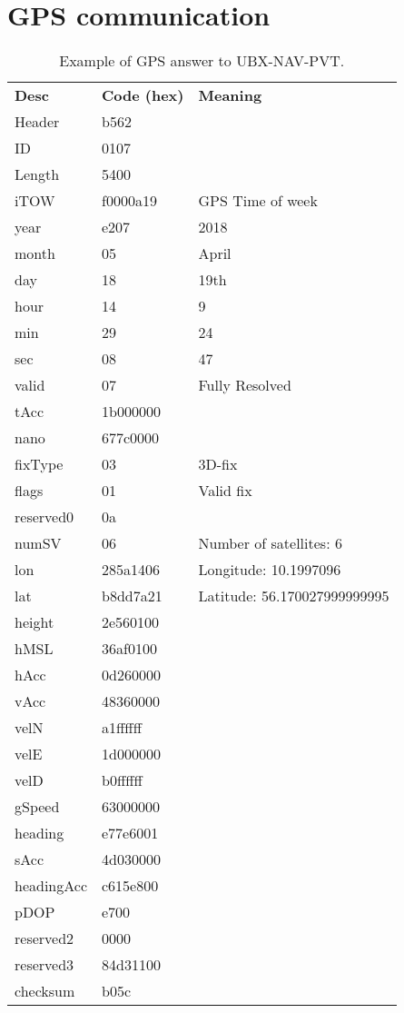 \appendix

\chapter{GPS communication}
\label{app:GPScomm}
\begin{table}[H]
	\centering
	\setlength{\extrarowheight}{0pt}
	\begin{tabularx}{0.8\textwidth}{p{2cm} p{2cm} X}
		\oldtoprule
		\textbf{Desc} & \textbf{Code (hex)} & \textbf{Meaning} \\
		\oldmidrule
		Header & b562 & \\
		ID & 0107 & \\
		Length & 5400 & \\
		iTOW & f0000a19 & GPS Time of week \\
		year & e207 & 2018 \\
		month & 05 & April \\
		day & 18 & 19th \\
		hour & 14 & 9 \\
		min & 29 & 24 \\
		sec & 08 & 47 \\
		valid & 07 & Fully Resolved \\
		tAcc & 1b000000 & \\
		nano & 677c0000 & \\
		fixType & 03 & 3D-fix \\
		flags & 01 & Valid fix \\
		reserved0 & 0a & \\
		numSV & 06 & Number of satellites: 6 \\
		lon & 285a1406 & Longitude: 10.1997096 \\
		lat & b8dd7a21 & Latitude: 56.170027999999995 \\
		height & 2e560100 & \\
		hMSL & 36af0100 & \\
		hAcc & 0d260000 & \\
		vAcc & 48360000 & \\
		velN & a1ffffff & \\
		velE & 1d000000 & \\
		velD & b0ffffff & \\
		gSpeed & 63000000 & \\
		heading & e77e6001 & \\
		sAcc & 4d030000 & \\
		headingAcc & c615e800 & \\
		pDOP & e700 & \\
		reserved2 & 0000 & \\
		reserved3 & 84d31100 & \\
		checksum & b05c & \\
		\bottomrule
	\end{tabularx}
	\caption{Example of GPS answer to UBX-NAV-PVT\cite[p.~160-161]{NEO7_proto}.}
	\label{tab:GPScomm}
\end{table}


